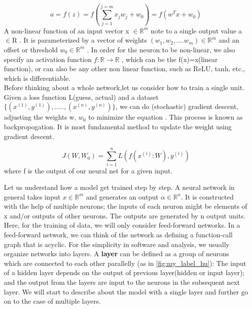 \begin{equation}\label{eq:eq1}
a= f(z) = f(\sum_{j=1}^{j=m} x_jw_j +w_0) = f(w^T x+w_0)
\end{equation}
A non-linear function of an input vector x $\in \mathbb{R}^m$ note to a single output value  a $\in$R . It is parameterized by a vector of weights  $(w_1, w_2,....w_m)\in \mathbb{R}^m$  and an offset or threshold  $w_0\in \mathbb{R}^m$ . In order for the neuron to be non-linear, we also specify an activation function  $f:\mathbb{R} \to \mathbb{R}$ , which can be the f(x)=x(linear function), or can also be any other non linear function, such as ReLU, tanh, etc., which is differentiable. 
\\
Before thinking about a whole network,let us consider how to train a single unit. \\
Given a loss function L(guess, actual) and a dataset $\{(x^{(1)},y^{(1)}),.....,(x^{(n)},y^{(n)})\}$, we can do (stochastic) gradient descent, adjusting the weights w, $w_0$ to minimize the equation \cite{LeCun2015}. This process is known as backpropogation. It is most fundamental method to update the weight using gradient descent. 

\begin{equation} \label{eq:eq2}
    J(W, W_0) = \sum_{i=1} ^n L(f(x^{(i)}:W),y^{(i)})
\end{equation}
where f is the output of our neural net for a given input.


Let us understand how a model get trained step by step. A neural network in general takes input $x \in \mathbb{R}^m$ and generates an output $\alpha \in \mathbb{R}^n $. It is constructed with the help of multiple neurons; the inputs of each neuron might be elements of x and/or outputs of other neurons. The outputs are generated by n output units. Here, for the training of data, we will only consider feed-forward networks. In a feed-forward network, we can think of the network as defining a function-call graph that is acyclic. For the simplicity in software and analysis, we usually organize networks into layers. A \textbf{layer} can be defined as a group of neurons which are connected to each other parallelly (as in \autoref{fig:my_label_hu}): The input of a hidden layer depends on the output of previous layer(hidden or input layer); and the output from the layers are input to the neurons in the subsequent next layer. We will start to describe about the model with a single layer and further go on to the case of multiple layers.

